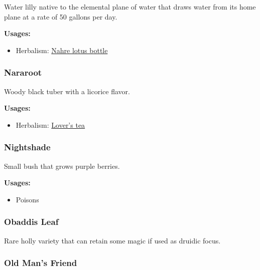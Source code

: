 Water lilly native to the elemental plane of water that draws water from its home plane at a rate of 50 gallons per day.

\vspace{5mm}

\textbf{Usages:}

\begin{itemize}[noitemsep]
\item[] Herbalism: \hyperref[Nahre lotus bottle]{Nahre lotus bottle}
\end{itemize}

\subsubsection{Nararoot}
\label{Nararoot}

Woody black tuber with a licorice flavor.

\vspace{5mm}

\textbf{Usages:}

\begin{itemize}[noitemsep]
\item[] Herbalism: \hyperref[Lover's tea]{Lover's tea}
\end{itemize}

\subsubsection{Nightshade}
\label{Nightshade}

Small bush that grows purple berries.

\vspace{5mm}

\textbf{Usages:}

\begin{itemize}[noitemsep]
\item[] Poisons \poison
\end{itemize}

\subsubsection{Obaddis Leaf}

Rare holly variety that can retain some magic if used as druidic focus.

\subsubsection{Old Man's Friend}
\label{Old Man's Friend}

